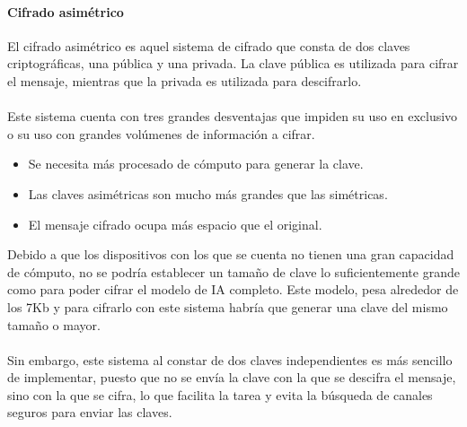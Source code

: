 \paragraph{Cifrado asimétrico}
El cifrado asimétrico es aquel sistema de cifrado que consta de dos claves criptográficas, una pública y una privada. La clave pública es utilizada para cifrar el mensaje, mientras que la privada es utilizada para descifrarlo. 
\\ \\
Este sistema cuenta con tres grandes desventajas que impiden su uso en exclusivo o su uso con grandes volúmenes de información a cifrar. 
\begin{itemize}
    \item Se necesita más procesado de cómputo para generar la clave.
    \item Las claves asimétricas son mucho más grandes que las simétricas.
    \item El mensaje cifrado ocupa más espacio que el original.
\end{itemize}

Debido a que los dispositivos con los que se cuenta no tienen una gran capacidad de cómputo, no se podría establecer un tamaño de clave lo suficientemente grande como para poder cifrar el modelo de IA completo. Este modelo, pesa alrededor de los 7Kb y para cifrarlo con este sistema habría que generar una clave del mismo tamaño o mayor.
\\ \\
Sin embargo, este sistema al constar de dos claves independientes es más sencillo de implementar, puesto que no se envía la clave con la que se descifra el mensaje, sino con la que se cifra, lo que facilita la tarea y evita la búsqueda de canales seguros para enviar las claves.

